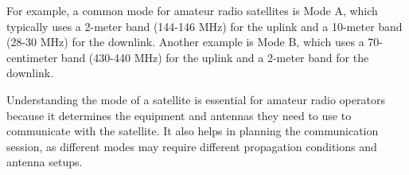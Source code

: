 For example, a common mode for amateur radio satellites is Mode A, which typically uses a 2-meter band (144-146 MHz) for the uplink and a 10-meter band (28-30 MHz) for the downlink. Another example is Mode B, which uses a 70-centimeter band (430-440 MHz) for the uplink and a 2-meter band for the downlink.

Understanding the mode of a satellite is essential for amateur radio operators because it determines the equipment and antennas they need to use to communicate with the satellite. It also helps in planning the communication session, as different modes may require different propagation conditions and antenna setups.

